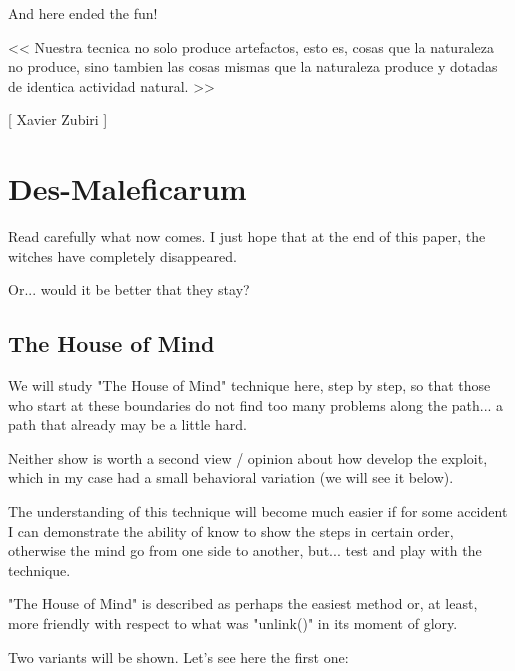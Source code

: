 \documentclass[12pt]{article}
\begin{document}
And here ended the fun!


\begin{verbnobox}[\small]
                  << Nuestra tecnica no solo produce artefactos,
                     esto es, cosas que la naturaleza no produce,
                     sino tambien las cosas mismas que la naturaleza
                     produce y dotadas de identica actividad
                     natural. >>

                                                   [ Xavier Zubiri ]
\end{verbnobox}

\section{Des-Maleficarum}

Read carefully what now comes. I just hope that at the end of this paper,
the witches have completely disappeared.
\newline


Or... would it be better that they stay?
\newline



\subsection{The House of Mind}

We will study "The House of Mind" technique here, step by step, so that
those who start at these boundaries do not find too many problems along
the path... a path that already may be a little hard.
\newline


Neither show is worth a second view / opinion about how develop the
exploit, which in my case had a small behavioral variation (we will see it
below).
\newline


The understanding of this technique will become much easier if for some
accident I can demonstrate the ability of know to show the steps in
certain order, otherwise the mind go from one side to another, but... test
and play with the technique.
\newline


"The House of Mind" is described as perhaps the easiest method or, at
least, more friendly with respect to what was "unlink()" in its moment of
glory.
\newline


Two variants will be shown. Let's see here the first one:
\newline
\end{document}
